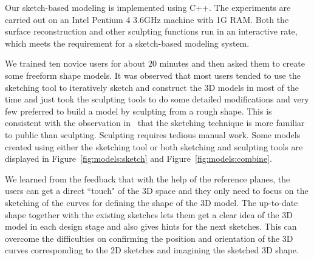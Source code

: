 Our sketch-based modeling is implemented using C++. The experiments
are carried out on  an Intel Pentium 4 3.6GHz machine with 1G RAM.
Both the surface reconstruction and other sculpting functions run in
an interactive rate, which meets the requirement for a sketch-based
modeling system.



We trained ten novice users for about 20 minutes and then asked them
to create some freeform shape models. It was observed that most
users tended to use the sketching tool to iteratively sketch and
construct the 3D models in most of the time and just took the
sculpting tools to do some detailed modifications and very few
preferred to build a model by sculpting from a rough shape. This is
consistent with the observation in~\cite{CIW08} that the sketching
technique is more familiar to public than sculpting. Sculpting
requires tedious manual work. Some models created using either the
sketching tool or both sketching and sculpting tools are displayed
in Figure~\ref{fig:models:sketch} and
Figure~\ref{fig:models:combine}.

We learned from the feedback that with the help of the reference
planes, the users can get a direct ``touch" of the 3D space and they
only need to focus on the sketching of the curves for defining the
shape of the 3D model. The up-to-date shape together with the
existing sketches lets them get a clear idea of the 3D model in each
design stage and also gives hints for the next sketches. This can
overcome the difficulties on confirming the position and orientation
of the 3D curves corresponding to the 2D sketches and imagining the
sketched 3D shape.





